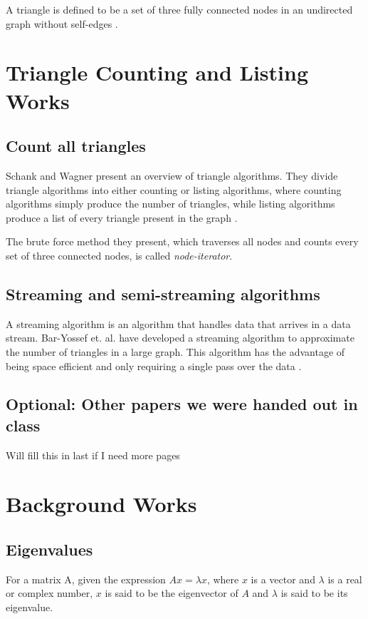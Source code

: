 \documentclass{acm_proc_article-sp}
\begin{document}
A triangle is defined to be a set of three fully connected nodes in an
undirected graph without self-edges \cite{original}.

\section{Triangle Counting and Listing Works}

\subsection{Count all triangles}
Schank and Wagner present an overview of triangle algorithms. They divide
triangle algorithms into either counting or listing algorithms, where counting
algorithms simply produce the number of triangles, while listing algorithms
produce a list of every triangle present in the graph \cite{schank}.

The brute force method they present, which traverses all nodes and counts every
set of three connected nodes, is called \textit{node-iterator}.

\subsection{Streaming and semi-streaming algorithms}
A streaming algorithm is an algorithm that handles data that arrives in a
data stream. Bar-Yossef et. al. have developed a streaming algorithm to
approximate the number of triangles in a large graph. This algorithm has the
advantage of being space efficient and only requiring a single pass over the
data \cite{baryossef}. 

\subsection{Optional: Other papers we were handed out in class}
Will fill this in last if I need more pages

\section{Background Works}

\subsection{Eigenvalues}
For a matrix A, given the expression $Ax = \lambda x$, where $x$ is a vector and
$\lambda$ is a real or complex number, $x$ is said to be the eigenvector of $A$
and $\lambda$ is said to be its eigenvalue. \cite{lovasz}
\end{document}
